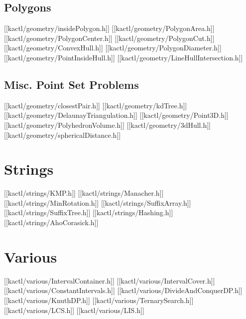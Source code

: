 \section{Polygons}

[[kactl/geometry/insidePolygon.h]]
[[kactl/geometry/PolygonArea.h]]
[[kactl/geometry/PolygonCenter.h]]
[[kactl/geometry/PolygonCut.h]]
[[kactl/geometry/ConvexHull.h]]
[[kactl/geometry/PolygonDiameter.h]]
[[kactl/geometry/PointInsideHull.h]]
[[kactl/geometry/LineHullIntersection.h]]

\section{Misc. Point Set Problems}

[[kactl/geometry/closestPair.h]]
[[kactl/geometry/kdTree.h]]
[[kactl/geometry/DelaunayTriangulation.h]]
[[kactl/geometry/Point3D.h]]
[[kactl/geometry/PolyhedronVolume.h]]
[[kactl/geometry/3dHull.h]]
[[kactl/geometry/sphericalDistance.h]]

\chapter{Strings}

[[kactl/strings/KMP.h]]
[[kactl/strings/Manacher.h]]
[[kactl/strings/MinRotation.h]]
[[kactl/strings/SuffixArray.h]]
[[kactl/strings/SuffixTree.h]]
[[kactl/strings/Hashing.h]]
[[kactl/strings/AhoCorasick.h]]

\chapter{Various}

[[kactl/various/IntervalContainer.h]]
[[kactl/various/IntervalCover.h]]
[[kactl/various/ConstantIntervals.h]]
[[kactl/various/DivideAndConquerDP.h]]
[[kactl/various/KnuthDP.h]]
[[kactl/various/TernarySearch.h]]
[[kactl/various/LCS.h]]
[[kactl/various/LIS.h]]

\singlecolumn
\bye
